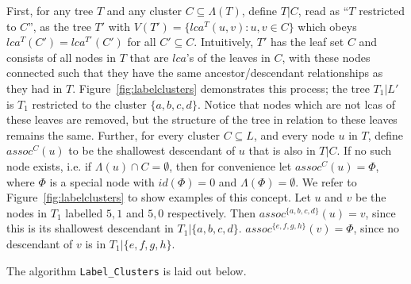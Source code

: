 \documentclass{article}
\newcommand{\leafset}{\Lambda}
\begin{document}
    First, for any tree $T$ and any cluster $C \subseteq \leafset(T)$, define $T|C$, read as ``$T$ restricted to $C$'', as the tree $T'$ with $V(T') = \{lca^T(u, v) : u, v \in C\}$ which obeys $lca^T(C') = lca^{T'}(C')$ for all $C' \subseteq C$. Intuitively, $T'$ has the leaf set $C$ and consists of all nodes in $T$ that are $lca$'s of the leaves in $C$, with these nodes connected such that they have the same ancestor/descendant relationships as they had in $T$. Figure~\ref{fig:labelclusters} demonstrates this process; the tree $T_1|L'$ is $T_1$ restricted to the cluster $\{a, b, c, d\}$. Notice that nodes which are not lcas of these leaves are removed, but the structure of the tree in relation to these leaves remains the same. Further, for every cluster $C \subseteq L$, and every node $u$ in $T$, define $assoc^C(u)$ to be the shallowest descendant of $u$ that is also in $T|C$. If no such node exists, i.e. if $\leafset(u) \cap C = \emptyset$, then for convenience let $assoc^{C}(u) = \Phi$, where $\Phi$ is a special node with $id(\Phi) = 0$ and $\leafset(\Phi) = \emptyset$. We refer to Figure~\ref{fig:labelclusters} to show examples of this concept. Let $u$ and $v$ be the nodes in $T_1$ labelled $5, 1$ and $5, 0$ respectively. Then $assoc^{\{a, b, c, d\}}(u) = v$, since this is its shallowest descendant in $T_1|\{a, b, c, d\}$. $assoc^{\{e, f, g, h\}}(v) = \Phi$, since no descendant of $v$ is in $T_1|\{e, f, g, h\}$.

    The algorithm \texttt{Label\_Clusters} is laid out below.
\end{document}
